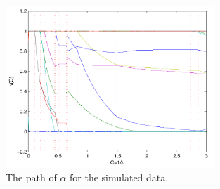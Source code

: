 \documentclass[10pt]{article}
\theoremstyle{definition}
\begin{document}
\begin{center}
\begin{figure}[!h]
   \centering
   \includegraphics[width=0.7\textwidth]{./alphaPath.pdf} 
      \caption{The path of $\alpha$ for the simulated data.}
   \label{fig:alphaPath}
\end{figure}
\end{center}




\end{document}
